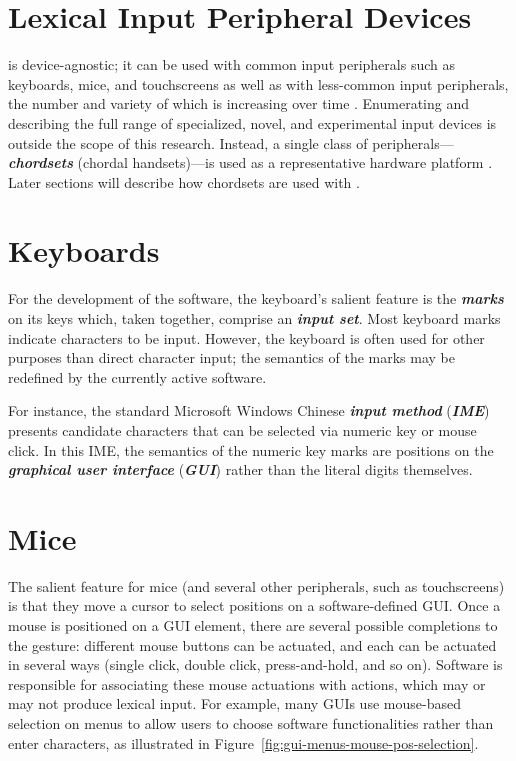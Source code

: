 \section{Lexical Input Peripheral
	Devices}\label{lexical-input-peripheral-devices}

\mulex{} is device-agnostic; it can be used with common input
peripherals such as keyboards, mice, and touchscreens as well as with
less-common input peripherals, the number and variety of which is
increasing over time \parencite{Rosenberg1998ComputingWithoutMice}.
Enumerating and describing the full range of specialized, novel, and
experimental input devices is outside the scope of this research.
Instead, a single class of peripherals---\emph{\textbf{chordsets}}
(chordal handsets)---is used as a representative hardware platform
\parencite{Noyes1983ChordKeyboards,Seibel1962FiveFingerChordKeyboard,
	Rosenberg1999ChordingGlove,Rude2019QwertyChordKeyboard,
	Tarniceriu2013FeedbackChordTyping,Wu2007ChordInputImprovements}.
Later sections will describe how chordsets are used with \mulex{}.

\section{Keyboards}\label{keyboards}

For the development of the \mulex{} software, the keyboard's salient
feature is the \emph{\textbf{marks}} on its keys which, taken together,
comprise an \emph{\textbf{input set}}. Most keyboard marks indicate
characters to be input. However, the keyboard is often used for other
purposes than direct character input; the semantics of the marks may be
redefined by the currently active software.

For instance, the standard Microsoft Windows Chinese
\emph{\textbf{input method}} (\emph{\textbf{IME}})
\parencite{Zheng2011WhyPressBackspace} presents candidate characters
that can be selected via numeric key or mouse click. In this IME, the
semantics of the numeric key marks are positions on the
\emph{\textbf{graphical user interface}} (\emph{\textbf{GUI}}) rather
than the literal digits themselves.

\section{Mice}\label{mice}

The salient feature for mice (and several other peripherals, such as
touchscreens) is that they move a cursor to select positions on a
software-defined GUI. Once a mouse is positioned on a GUI element, there
are several possible completions to the gesture: different mouse buttons
can be actuated, and each can be actuated in several ways (single click,
double click, press-and-hold, and so on). Software is responsible for
associating these mouse actuations with actions, which may or may not
produce lexical input. For example, many GUIs use mouse-based selection
on menus to allow users to choose software functionalities rather than
enter characters, as illustrated in Figure~\ref{fig:gui-menus-mouse-pos-selection}.

